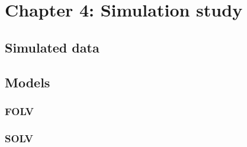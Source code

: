 

\section{Chapter 4: Simulation study} \label{app:chapter4}

\subsection{Simulated data} \label{app:sim}


\subsection{Models} \label{app:models}

\subsubsection{FOLV} 



\subsubsection{SOLV} 


